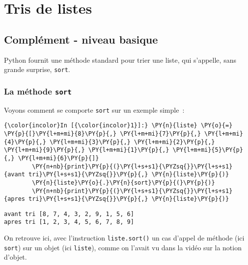     \hypertarget{tris-de-listes}{%
\section{Tris de listes}\label{tris-de-listes}}

    \hypertarget{compluxe9ment---niveau-basique}{%
\subsection{Complément - niveau
basique}\label{compluxe9ment---niveau-basique}}

    Python fournit une méthode standard pour trier une liste, qui s'appelle,
sans grande surprise, \texttt{sort}.

    \hypertarget{la-muxe9thode-sort}{%
\subsubsection{\texorpdfstring{La méthode
\texttt{sort}}{La méthode sort}}\label{la-muxe9thode-sort}}

    Voyons comment se comporte \texttt{sort} sur un exemple simple~:

    \begin{Verbatim}[commandchars=\\\{\}]
{\color{incolor}In [{\color{incolor}1}]:} \PY{n}{liste} \PY{o}{=} \PY{p}{[}\PY{l+m+mi}{8}\PY{p}{,} \PY{l+m+mi}{7}\PY{p}{,} \PY{l+m+mi}{4}\PY{p}{,} \PY{l+m+mi}{3}\PY{p}{,} \PY{l+m+mi}{2}\PY{p}{,} \PY{l+m+mi}{9}\PY{p}{,} \PY{l+m+mi}{1}\PY{p}{,} \PY{l+m+mi}{5}\PY{p}{,} \PY{l+m+mi}{6}\PY{p}{]}
        \PY{n+nb}{print}\PY{p}{(}\PY{l+s+s1}{\PYZsq{}}\PY{l+s+s1}{avant tri}\PY{l+s+s1}{\PYZsq{}}\PY{p}{,} \PY{n}{liste}\PY{p}{)}
        \PY{n}{liste}\PY{o}{.}\PY{n}{sort}\PY{p}{(}\PY{p}{)}
        \PY{n+nb}{print}\PY{p}{(}\PY{l+s+s1}{\PYZsq{}}\PY{l+s+s1}{apres tri}\PY{l+s+s1}{\PYZsq{}}\PY{p}{,} \PY{n}{liste}\PY{p}{)}
\end{Verbatim}


    \begin{Verbatim}[commandchars=\\\{\}]
avant tri [8, 7, 4, 3, 2, 9, 1, 5, 6]
apres tri [1, 2, 3, 4, 5, 6, 7, 8, 9]

    \end{Verbatim}

    On retrouve ici, avec l'instruction \texttt{liste.sort()} un cas d'appel
de méthode (ici \texttt{sort}) sur un objet (ici \texttt{liste}), comme
on l'avait vu dans la vidéo sur la notion d'objet.\\


